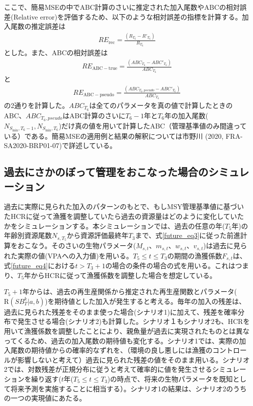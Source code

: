 \documentclass[11pt]{jsarticle}
\begin{document}
ここで、簡易MSEの中でABC計算のさいに推定された加入尾数やABCの相対誤差(Relative error)を評価するため、以下のような相対誤差の指標を計算する。加入尾数の推定誤差は
\begin{eqnarray}
  R\!E_{\mathrm{rec}} = \frac{(R_{T_6}-R'_{T_6})}{R_{T_6}}
\label{RE1}
\end{eqnarray}
とした。また、ABCの相対誤差は
\begin{eqnarray}
  R\!E_{\mathrm{ABC-true}} = \frac{(ABC_{T_6}-ABC'_{T_6})}{ABC_{T_6}}
\label{ABC_eq1}
\end{eqnarray}
と
\begin{eqnarray}
  R\!E_{\mathrm{ABC-pseudo}} = \frac{(ABC_{T_6, pseudo}-ABC'_{T_6})}{ABC_{T_6}}
\label{ABC_eq2}
\end{eqnarray}
の2通りを計算した。$ABC_{T_6}$は全てのパラメータを真の値で計算したときのABC、$ABC_{T_6, pseudo}$はABC計算のさいに$T_6-1$年と$T_6$年の加入尾数($N_{S_{\mathrm{min}},T_6 -1}, N_{S_{\mathrm{min}},T_6}$)だけ真の値を用いて計算したABC（管理基準値のみ間違っている）である。簡易MSEの適用例と結果の解釈については市野川 (2020, FRA-SA2020-BRP01-07)で詳述している。

\subsection{過去にさかのぼって管理をおこなった場合のシミュレーション\label{sec:whatif}}

過去に実際に見られた加入のパターンのもとで、もしMSY管理基準値に基づいたHCRに従って漁獲を調整していたら過去の資源量はどのように変化していたかをシミュレーションする。本シミュレーションでは、過去の任意の年($T_5$年)の年齢別資源尾数$N_{s,T_5}$から資源評価最終年$T_3$まで、式\ref{future_eq3}に従った前進計算をおこなう。そのさいの生物パラメータ($M_{s,t}$、$m_{s,t}$、$w_{s,t}$、$v_{s,t}$)は過去に見られた実際の値(VPAへの入力値)を用いる。$T_5 \leq t \leq T_3$の期間の漁獲係数$F_{s,t}$は、式\ref{future_eq4}における$t > T_3+1$の場合の条件の場合の式を用いる。これはつまり、$T_5$年からHCRに従って漁獲係数を調整した場合を想定している。

$T_5+1$年からは、過去の再生産関係から推定された再生産関数とパラメータ($\mathrm{R}(S\!B_{T}^k|a,b)$)を期待値とした加入が発生すると考える。毎年の加入の残差は、過去に見られた残差をそのまま使った場合(シナリオ1)に加えて、残差を確率分布で発生させる場合(シナリオ2)も計算した。シナリオ１もシナリオ2も、HCRを用いて漁獲係数を調整したことにより、親魚量が過去に実現されたものとは異なってくるため、過去の加入尾数の期待値も変化する。シナリオ1では、実際の加入尾数の期待値からの確率的なずれを、（環境の良し悪しには漁獲のコントロールが影響しないと考えて）過去に見られた残差の値をそのまま用いる。シナリオ2では、対数残差が正規分布に従うと考えて確率的に値を発生させるシミュレーションを繰り返す($t$年($T_5 \leq t \leq T_3$)の時点で、将来の生物パラメータを既知として将来予測を実施することに相当する）。シナリオ1の結果は、シナリオ2のうちの一つの実現値にあたる。
\end{document}
